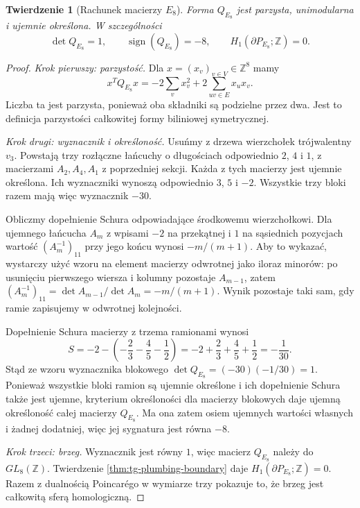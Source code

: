\documentclass[11pt,a4paper]{report}
\numberwithin{equation}{section}
\theoremstyle{plain}
\newtheorem{twierdzenie}{Twierdzenie}[section]
\theoremstyle{definition}
\theoremstyle{remark}
\begin{document}
\begin{twierdzenie}[Rachunek macierzy $E_8$]
\label{thm:tg-E8-unimodular}
Forma $Q_{E_8}$ jest parzysta, unimodularna i ujemnie
określona. W szczególności
\[
\det Q_{E_8}=1,\qquad \operatorname{sign}(Q_{E_8})=-8,
\qquad H_1(\partial P_{E_8};\mathbb Z)=0.
\]
\end{twierdzenie}

\begin{proof}
\emph{Krok pierwszy: parzystość.}
Dla $x=(x_v)_{v\in V}\in\mathbb Z^8$ mamy
\[
x^TQ_{E_8}x=-2\sum_vx_v^2+2\sum_{uv\in E}x_ux_v.
\]
Liczba ta jest parzysta, ponieważ oba składniki są
podzielne przez dwa. Jest to definicja parzystości
całkowitej formy biliniowej symetrycznej.

\emph{Krok drugi: wyznacznik i określoność.}
Usuńmy z drzewa wierzchołek trójwalentny $v_3$.
Powstają trzy rozłączne łańcuchy o długościach odpowiednio
$2$, $4$ i $1$, z macierzami $A_2,A_4,A_1$ z poprzedniej
sekcji. Każda z tych macierzy jest ujemnie określona.
Ich wyznaczniki wynoszą odpowiednio $3$, $5$ i $-2$.
Wszystkie trzy bloki razem mają więc wyznacznik $-30$.

Obliczmy dopełnienie Schura odpowiadające środkowemu
wierzchołkowi. Dla ujemnego łańcucha $A_m$ z
wpisami $-2$ na przekątnej i $1$ na sąsiednich
pozycjach wartość $(A_m^{-1})_{11}$ przy jego końcu
wynosi $-m/(m+1)$. Aby to wykazać, wystarczy użyć
wzoru na element macierzy odwrotnej jako iloraz
minorów: po usunięciu pierwszego wiersza i kolumny
pozostaje $A_{m-1}$, zatem
$(A_m^{-1})_{11}=\det A_{m-1}/\det A_m=-m/(m+1)$.
Wynik pozostaje taki sam, gdy ramie zapisujemy w
odwrotnej kolejności.

Dopełnienie Schura macierzy z trzema ramionami wynosi
\[
S=-2-\left(-\frac23-\frac45-\frac12\right)
=-2+\frac23+\frac45+\frac12=-\frac1{30}.
\]
Stąd ze wzoru wyznacznika blokowego
$\det Q_{E_8}=(-30)(-1/30)=1$. Ponieważ wszystkie
bloki ramion są ujemnie określone i ich dopełnienie
Schura także jest ujemne, kryterium określoności
dla macierzy blokowych daje ujemną określoność
całej macierzy $Q_{E_8}$. Ma ona zatem osiem
ujemnych wartości własnych i żadnej dodatniej,
więc jej sygnatura jest równa $-8$.

\emph{Krok trzeci: brzeg.}
Wyznacznik jest równy $1$, więc macierz $Q_{E_8}$
należy do $GL_8(\mathbb Z)$. Twierdzenie
\ref{thm:tg-plumbing-boundary} daje
$H_1(\partial P_{E_8};\mathbb Z)=0$.
Razem z dualnością Poincarégo w wymiarze trzy
pokazuje to, że brzeg jest całkowitą sferą homologiczną.
\end{proof}
\end{document}
